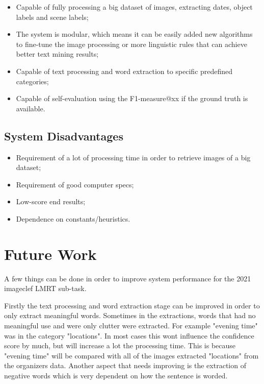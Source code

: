 \begin{itemize}
    \itemsep0em
    \item Capable of fully processing a big dataset of images, extracting dates, object labels and scene labels;
    \item The system is modular, which means it can be easily added new algorithms to fine-tune the image processing or more linguistic rules that can achieve better text mining results;
    \item Capable of text processing and word extraction to specific predefined categories;
    \item Capable of self-evaluation using the F1-measure@xx if the ground truth is available.
\end{itemize}


\subsection{System Disadvantages}

\begin{itemize}
    \itemsep0em
    \item Requirement of a lot of processing time in order to retrieve images of a big dataset;
    \item Requirement of  good computer specs;
    \item Low-score end results;
    \item Dependence on constants/heuristics.
\end{itemize}

\section{Future Work}

A few things can be done in order to improve system performance for the 2021 imageclef LMRT sub-task.

Firstly the text processing and word extraction stage can be improved in order to only extract meaningful words. Sometimes in the extractions, words that had no meaningful use and were only clutter were extracted. For example "evening time" was in the category "locations". In most cases this wont influence the confidence score by much, but will increase a lot the processing time. This is because "evening time" will be compared with all of the images extracted "locations" from the organizers data. Another aspect that needs improving is the extraction of negative words which is very dependent on how the sentence is worded.

